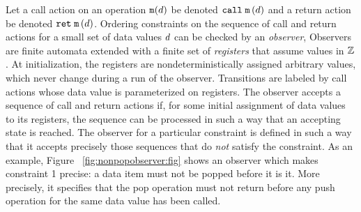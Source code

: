 Let a call action on an operation ${\tt m}(d)$ be denoted
$\mathtt{call}\; {\tt m}\left(d\right)$ and a return action be denoted
$\mathtt{ret}\; {\tt m}\left(d\right)$. Ordering constraints on the sequence of
call and return actions for a small set of data values $d$ can be
checked by an {\em observer},
%
Observers are
finite automata extended with a finite set of {\em registers}
that assume values in ${\mathbb Z}$. 
%
At initialization,
the registers are nondeterministically
assigned arbitrary values, which never change
during a run of the observer. 
%
Transitions are labeled by call actions whose data value
is parameterized on registers.%
%
The observer accepts a sequence of call and return actions
if, for some initial assignment of data values to its registers, the sequence
can  be processed in such a way that an accepting state is reached.
The observer for a particular constraint is defined in such a way that it
accepts precisely those sequences  that do {\em not} satisfy the constraint.
As an example, Figure ~\ref{fig:nonpopobserver:fig} shows an observer which
makes constraint 1 precise:
a data item must not be popped before it is it. More precisely, it
specifies that the pop operation must not return before any push operation
for the same data value has been called.

